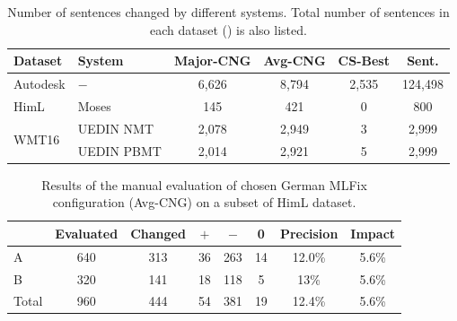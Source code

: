 \begin{table}[t]
\centering
\small
{}
\caption{
	Final evaluation of Englsh-German configuration of MLFix. Majority-CNG and Avg-CNG methods were compared
with the best English-Czech configuration.
}
\label{final_de-summary}
\end{table}

\begin{table}[t]
\centering
\small

\begin{tabular}{|l|l||c|c|c||c|}
\hline
Dataset  &  System  &  Major-CNG  &  Avg-CNG  &  CS-Best  &  Sent.  \\
\hline
\hline
Autodesk  &  $-$  &  6,626  &  8,794  &  2,535  &  124,498  \\
\hline
HimL  &  Moses  &  145  &  421  &  0  &  800  \\
\hline
\multirow{2}{*}{WMT16}  &  UEDIN NMT  &  2,078  &  2,949  &  3  &  2,999  \\
&  UEDIN PBMT  &  2,014  &  2,921  &  5  &  2,999  \\
\hline
\end{tabular}

\caption{
    Number of sentences changed by different systems. Total number of
sentences in each dataset () is also listed.
}   
\label{final_de-chgd}
\end{table}



\begin{table}[t]
\centering
\small

\begin{tabular}{l|cc|ccc|cc}
  &  Evaluated  &  Changed  &  $+$  &  $-$  &  0  &  Precision  &  Impact  \\
\hline
A  &  640  &  313  &  36  &  263  &  14  &  12.0\%  &  5.6\%  \\
B  &  320  &  141  &  18   &  118  &  5  &  13\%  &  5.6\%  \\ 
\hline
Total &  960  &  444  &  54  &  381  &  19  &  12.4\%  &  5.6\%  \\
\end{tabular}
\caption{
Results of the manual evaluation of chosen German MLFix configuration (Avg-CNG)
on a subset of HimL dataset.
}
\label{maneval_de-final}
\end{table}


